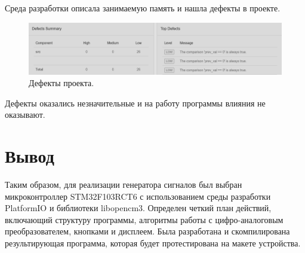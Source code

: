 	Среда разработки описала занимаемую память и нашла дефекты в проекте.
	
	\begin{figure}[H]
    \centering
    \includegraphics[width=1\textwidth]{../image/defects.png}
    \caption{Дефекты проекта.}
	\end{figure}
	
	Дефекты оказались незначительные и на работу программы влияния не оказывают.
	
\section{Вывод}
	
	Таким образом, для реализации генератора сигналов был выбран микроконтроллер STM32F103RCT6 с использованием среды разработки PlatformIO и библиотеки libopencm3. Определен четкий план действий, включающий структуру программы, алгоритмы работы с цифро-аналоговым преобразователем, кнопками и дисплеем. Была разработана и скомпилирована результирующая программа, которая будет протестирована на макете устройства.

	
	
